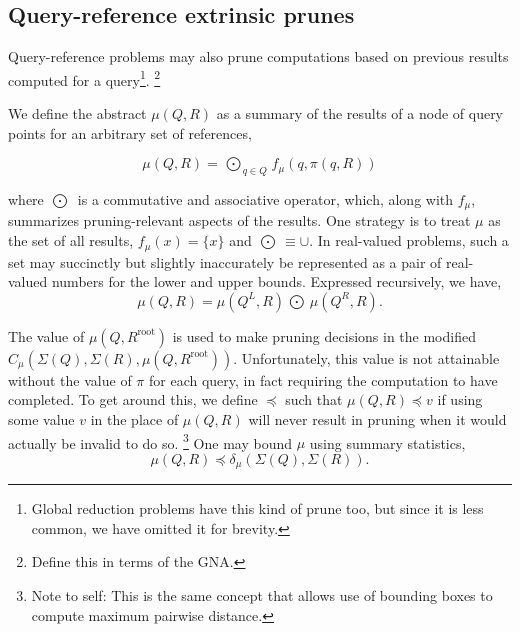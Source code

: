 \documentclass[times, leqno,twocolumn]{article}
\newcommand{\authornote}[1]{\footnote{Note to self: #1}}
\newcommand{\union}{\cup}
\newcommand{\kdroot}[1]{#1^{\text{root}}}
\newcommand{\kdleft}[1]{#1^{\!L}}
\newcommand{\kdright}[1]{#1^{\!R}}
\newcommand{\myOutop}[1]{\mathop{\bigodot\nolimits\!\!_{#1}}}
\newcommand{\myoutop}[1]{\mathop{\bigodot\nolimits\!\!_{#1}}}
\newcommand{\inqr}{\pi}
\newcommand{\lettermu}{\mu}
\newcommand{\inmu}{\mu}
\newcommand{\Outopmu}{\myOutop{\mu}}
\newcommand{\outopmu}{\myoutop{\mu}}
\newcommand{\fmu}{f_{\mu}}
\newcommand{\deltamu}{\delta_{\mu}}
\newcommand{\canprunemu}{C_{\mu}}
\newcommand{\allowmu}{\preceq}
\newcommand{\outstat}{\Sigma}
\begin{document}
\subsection{Query-reference extrinsic prunes}

Query-reference problems may also prune computations based on previous results computed for a query\footnote{Global reduction problems have this kind of prune too, but since it is less common, we have omitted it for brevity.}.
\footnote{Define this in terms of the GNA.}

We define the abstract $\inmu(Q, R)$ as a summary of the results of a node of query points for an arbitrary set of references,

\begin{equation}
\inmu(Q, R) = \Outopmu_{q \in Q} \fmu(q, \inqr(q, R))
\label{eqn:defmu}
\end{equation}

\noindent where $\Outopmu$ is a commutative and associative operator, which, along with $\fmu$, summarizes pruning-relevant aspects of the results.
One strategy is to treat $\inmu$ as the set of all results, $\fmu(x) = \{x\}$ and $\Outopmu \equiv \union$.
In real-valued problems, such a set may succinctly but slightly inaccurately be represented as a pair of real-valued numbers for the lower and upper bounds.
Expressed recursively, we have,
\begin{equation}
\inmu(Q, R) = \inmu(\kdleft{Q}, R) \outopmu \inmu(\kdright{Q}, R).
\label{eqn:dividemu}
\end{equation}

The value of $\inmu(Q, \kdroot{R})$ is used to make pruning decisions in the modified $\canprunemu(\outstat(Q), \outstat(R), \inmu(Q, \kdroot{R}))$.
Unfortunately, this value is not attainable without the value of $\inqr$ for each query, in fact requiring the computation to have completed.
To get around this, we define $\allowmu$ such that $\inmu(Q,R) \allowmu v$ if using some value $v$ in the place of $\inmu(Q, R)$ will never result in pruning when it would actually be invalid to do so.
\authornote{This is the same concept that allows use of bounding boxes to compute maximum pairwise distance.}
One may bound $\inmu$ using summary statistics,
\begin{equation}
\inmu(Q, R) \allowmu \deltamu(\outstat(Q), \outstat(R)).
\label{eqn:approxmu}
\end{equation}
\end{document}
